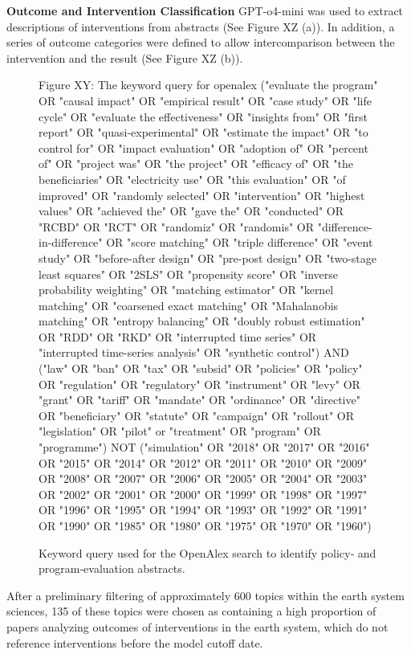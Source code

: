\documentclass[12pt,a4paper]{article}
\begin{document}
\textbf{Outcome and Intervention Classification}
GPT-o4-mini was used to extract descriptions of interventions from abstracts (See Figure XZ (a)). In addition, a series of outcome categories were defined to allow intercomparison between the intervention and the result (See Figure XZ (b)). 
\begin{figure}[htbp]
  \centering
  \begin{tcolorbox}[left=4pt, right=4pt, top=4pt, bottom=4pt]
\ttfamily\footnotesize
Figure XY: The keyword query for openalex
("evaluate the program" OR "causal impact" OR "empirical result" OR "case study" OR "life cycle" OR "evaluate the effectiveness" OR "insights from" OR "first report" OR "quasi-experimental" OR "estimate the impact" OR "to control for" OR "impact evaluation" OR "adoption of" OR "percent of" OR "project was" OR "the project" OR "efficacy of" OR "the beneficiaries" OR "electricity use" OR "this evaluation" OR "of improved" OR "randomly selected" OR "intervention" OR "highest values" OR "achieved the" OR "gave the" OR "conducted" OR "RCBD" OR "RCT" OR "randomiz" OR "randomis" OR "difference-in-difference" OR "score matching" OR "triple difference" OR "event study" OR "before-after design" OR "pre-post design" OR "two-stage least squares" OR "2SLS" OR "propensity score" OR "inverse probability weighting" OR "matching estimator" OR "kernel matching" OR "coarsened exact matching" OR "Mahalanobis matching" OR "entropy balancing" OR "doubly robust estimation" OR "RDD" OR "RKD" OR "interrupted time series" OR "interrupted time-series analysis" OR "synthetic control") AND ("law" OR "ban" OR "tax" OR "subsid" OR "policies" OR "policy" OR "regulation" OR "regulatory" OR "instrument" OR "levy" OR "grant" OR "tariff" OR "mandate" OR "ordinance" OR "directive" OR "beneficiary" OR "statute" OR "campaign" OR "rollout" OR "legislation" OR "pilot" or "treatment" OR "program" OR "programme") NOT ("simulation" OR "2018" OR "2017" OR "2016" OR "2015" OR "2014" OR "2012" OR "2011" OR "2010" OR "2009" OR "2008" OR "2007" OR "2006" OR "2005" OR "2004" OR "2003" OR "2002" OR "2001" OR "2000" OR "1999" OR "1998" OR "1997" OR "1996" OR "1995" OR "1994" OR "1993" OR "1992" OR "1991" OR "1990" OR "1985" OR "1980" OR "1975" OR "1970" OR "1960")
  \end{tcolorbox}
  \caption{Keyword query used for the OpenAlex search to identify policy‐ and program‐evaluation abstracts.}
  \label{fig:openalex-query}
\end{figure}

After a preliminary filtering of approximately 600 topics within the earth system sciences, 135 of these topics were chosen as containing a high proportion of papers analyzing outcomes of interventions in the earth system, which do not reference interventions before the model cutoff date. 
\end{document}
